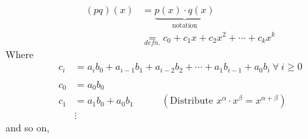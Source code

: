 \begin{definition}
    \begin{align}
        (pq)(x) &= \underbrace{p(x)\cdot q(x)}_{\text{notation}} \nonumber \\
        &\underset{defn.}{=} c_0 + c_1x + c_2x^2 + \cdots + c_kx^k \nonumber
    \end{align}
    Where
    \begin{align}
        c_i &= a_i b_0 + a_{i-1}b_1 + a_{i-2}b_{2} + \cdots + a_1b_{i-1} + a_0b_i \  \forall  \ i \geq 0 \nonumber \\
        \ \nonumber \\
        c_0 &= a_0b_0   \nonumber \\
        c_1 &= a_1b_0 + a_0b_1 \ \ \ \ \ \ \ \ \ \ \ \ \ (\text{Distribute } x^\alpha \cdot x^\beta = x^{\alpha + \beta}) \nonumber \\
        &\vdots \nonumber
    \end{align}
    and so on,
\end{definition}

